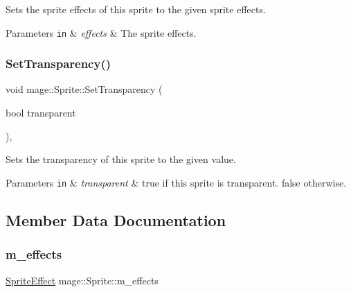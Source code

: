 Sets the sprite effects of this sprite to the given sprite effects.


\begin{DoxyParams}[1]{Parameters}
\mbox{\tt in}  & {\em effects} & The sprite effects. \\
\hline
\end{DoxyParams}
\hypertarget{classmage_1_1_sprite_a7e227faa0f2b058d4cbcbb252a49e728}{}\label{classmage_1_1_sprite_a7e227faa0f2b058d4cbcbb252a49e728} 
\subsubsection{\texorpdfstring{Set\+Transparency()}{SetTransparency()}}
{\footnotesize\ttfamily void mage\+::\+Sprite\+::\+Set\+Transparency (\begin{DoxyParamCaption}\item[{bool}]{transparent }\end{DoxyParamCaption})\hspace{0.3cm}{\ttfamily [protected]}, {\ttfamily [noexcept]}}

Sets the transparency of this sprite to the given value.


\begin{DoxyParams}[1]{Parameters}
\mbox{\tt in}  & {\em transparent} & {\ttfamily true} if this sprite is transparent. {\ttfamily false} otherwise. \\
\hline
\end{DoxyParams}


\subsection{Member Data Documentation}
\hypertarget{classmage_1_1_sprite_a87a51b2b131c28bad75768d14defa3c1}{}\label{classmage_1_1_sprite_a87a51b2b131c28bad75768d14defa3c1} 
\subsubsection{\texorpdfstring{m\+\_\+effects}{m\_effects}}
{\footnotesize\ttfamily \hyperlink{namespacemage_a9cfe18123066ba4236f548f9de75d881}{Sprite\+Effect} mage\+::\+Sprite\+::m\+\_\+effects\hspace{0.3cm}{\ttfamily [private]}}


